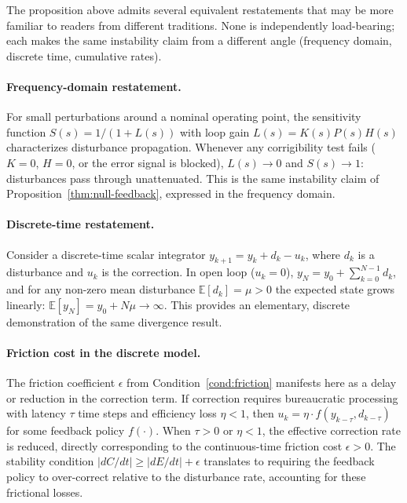 \documentclass{article}
\begin{document}
The proposition above admits several equivalent restatements that may be more familiar to readers from different traditions. None is independently load-bearing; each makes the same instability claim from a different angle (frequency domain, discrete time, cumulative rates).

\paragraph{Frequency-domain restatement.} For small perturbations around a nominal operating point, the sensitivity function $S(s) = 1 / (1 + L(s))$ with loop gain $L(s) = K(s) P(s) H(s)$ characterizes disturbance propagation. Whenever any corrigibility test fails ($K=0$, $H=0$, or the error signal is blocked), $L(s) \to 0$ and $S(s) \to 1$: disturbances pass through unattenuated. This is the same instability claim of Proposition~\ref{thm:null-feedback}, expressed in the frequency domain.

\paragraph{Discrete-time restatement.}
\label{subsec:discrete-integrator}
Consider a discrete-time scalar integrator $y_{k+1} = y_k + d_k - u_k$, where $d_k$ is a disturbance and $u_k$ is the correction. In open loop ($u_k = 0$), $y_N = y_0 + \sum_{k=0}^{N-1} d_k$, and for any non-zero mean disturbance $\mathbb{E}[d_k] = \mu > 0$ the expected state grows linearly: $\mathbb{E}[y_N] = y_0 + N\mu \to \infty$. This provides an elementary, discrete demonstration of the same divergence result.

\paragraph{Friction cost in the discrete model.} The friction coefficient $\epsilon$ from Condition~\ref{cond:friction} manifests here as a delay or reduction in the correction term. If correction requires bureaucratic processing with latency $\tau$ time steps and efficiency loss $\eta < 1$, then $u_k = \eta \cdot f(y_{k-\tau}, d_{k-\tau})$ for some feedback policy $f(\cdot)$. When $\tau > 0$ or $\eta < 1$, the effective correction rate is reduced, directly corresponding to the continuous-time friction cost $\epsilon > 0$. The stability condition $|dC/dt| \geq |dE/dt| + \epsilon$ translates to requiring the feedback policy to over-correct relative to the disturbance rate, accounting for these frictional losses.
\end{document}
